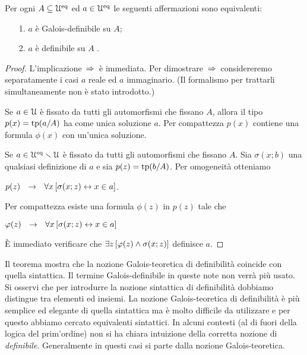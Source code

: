 \begin{theorem}\label{thm_Galois_def=def}
\label{galois1} Per ogni $A\subseteq\EuScript U^{\rm eq}$ ed $a\in\EuScript U^{\rm eq}$ le seguenti affermazioni sono equivalenti:
\begin{itemize}
\item[1.] $a$ \`e Galois-definibile su $A$;
\item[2.] $a$ \`e definibile su $A$ .
\end{itemize}
\end{theorem}
\begin{proof} L'implicazione $\,\Rightarrow\,$ \`e immediata. Per dimostrare $\,\Rightarrow\,$ considereremo separatamente i casi $a$ reale ed $a$ immaginario. (Il formalismo per trattarli simultaneamente non \`e stato introdotto.)

Se $a\in\EuScript U$ \`e fissato da tutti gli automorfismi che fissano $A$, allora il tipo $p(x)=\textrm{tp}(a/A)$ ha come unica soluzione $a$. Per compattezza $p(x)$ contiene una formula $\phi(x)$ con un'unica soluzione.

Se $a\in\EuScript U^{\rm eq}\smallsetminus\EuScript U$ \`e fissato da tutti gli automorfismi che fissano $A$. Sia $\sigma(x;b)$ una qualsiasi definizione di $a$ e sia $p(z)=\textrm{tp}(b/A)$. Per omogeneit\`a otteniamo

\hfil$p(z)\ \ \rightarrow\ \ \forall x\,[\sigma(x;z)\leftrightarrow x\in a]$.

Per compattezza esiste una formula $\phi(z)$ in $p(z)$ tale che

\hfil$\varphi(z)\ \ \rightarrow\ \ \forall x\,[\sigma(x;z)\leftrightarrow x\in a]$

\`E immediato verificare che $\exists z\,[\varphi(z)\wedge\sigma(x;z)]$ definisce $a$.
%
%
\end{proof}

Il teorema mostra che la nozione Galois-teoretica di definibilit\`a coincide con quella sintattica.  Il termine Galois-definibile in queste note non verr\`a pi\`u usato. Si osservi che per introdurre la nozione sintattica di definibilit\`a dobbiamo distingue tra elementi ed insiemi. La nozione  Galois-teoretica di definibilit\`a \`e pi\`u semplice ed elegante di quella sintattica ma \`e molto difficile da utilizzare e per questo abbiamo cercato equivalenti sintattici. In alcuni contesti (al di fuori della logica del prim'ordine) non si ha chiara intuizione della corretta nozione di \textit{definibile}. Generalmente in questi casi si parte dalla nozione Galois-teoretica.

